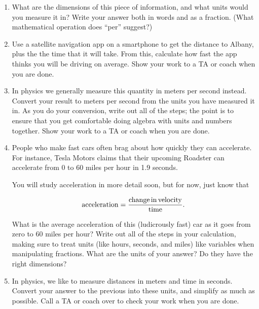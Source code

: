 \documentclass[12pt]{article}
\begin{document}
\begin{enumerate}
	\vspace{1.2in}
	
	\item What are the dimensions of this piece of information, and what units would you measure it in? Write your answer both in
	words and as a fraction. (What mathematical operation does ``per'' suggest?)
	
	\vspace{1.2in}
	
	\item Use a satellite navigation app on a smartphone to get the distance to Albany, plus the the time that it will take.
	From this, calculate how fast the app thinks you will be driving on average. Show your work to a TA or coach when you are done.
	
	\vspace{1.8in}
	
	\item In physics we generally measure this quantity in meters per second instead.
	Convert your result to meters per second from the units you have measured it in. As you do your conversion, write out all of the
	steps; the point is to ensure that you get comfortable doing algebra with units and numbers together. Show your work to a TA
	or coach when you are done.
	
	\vspace{2.5in}
	
	
	\item People who make fast cars often brag about how quickly they can accelerate. For instance, Tesla Motors claims that
	their upcoming Roadster can accelerate from 0 to 60 miles per hour in 1.9 seconds.
	
	You will study acceleration in more detail soon, but for now, just know that
	
	$$
	{\rm acceleration} = \frac{\rm change\, in\, velocity}{\rm time}.
	$$
	
	What is the average acceleration of this (ludicrously fast) car as it goes from zero to 60 miles per hour? Write out all of the
	steps in your calculation, making sure to treat units (like hours, seconds, and miles) like variables when manipulating fractions.
	What are the units of your answer? Do they have the right dimensions?
	
	\vspace{2in}
	\newpage
	\item In physics, we like to measure distances in meters and time in seconds. Convert your answer to the previous into these
	units, and simplify as much as possible. Call a TA or coach over to check your work when you are done.
	

\end{enumerate}
\end{document}
